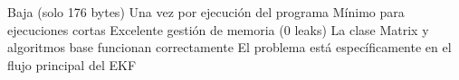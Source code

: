 \markdownRendererOlEndTight \markdownRendererInterblockSeparator
{}
\markdownRendererSectionEnd \markdownRendererSectionBegin
{}\markdownRendererInterblockSeparator
{}\markdownRendererSectionBegin
{}\markdownRendererInterblockSeparator
{}\markdownRendererUlBeginTight
\markdownRendererUlItem {} Baja (solo 176 bytes)\markdownRendererUlItemEnd 
\markdownRendererUlItem {} Una vez por ejecución del programa\markdownRendererUlItemEnd 
\markdownRendererUlItem {} Mínimo para ejecuciones cortas\markdownRendererUlItemEnd 
\markdownRendererUlEndTight \markdownRendererInterblockSeparator
{}
\markdownRendererSectionEnd \markdownRendererSectionBegin
{}\markdownRendererInterblockSeparator
{}\markdownRendererUlBeginTight
\markdownRendererUlItem {} Excelente gestión de memoria (0 leaks)\markdownRendererUlItemEnd 
\markdownRendererUlItem {} La clase Matrix y algoritmos base funcionan correctamente\markdownRendererUlItemEnd 
\markdownRendererUlItem {} El problema está específicamente en el flujo principal del EKF\markdownRendererUlItemEnd 
\markdownRendererUlEndTight 
\markdownRendererSectionEnd 
\markdownRendererSectionEnd 
\markdownRendererSectionEnd \markdownRendererDocumentEnd